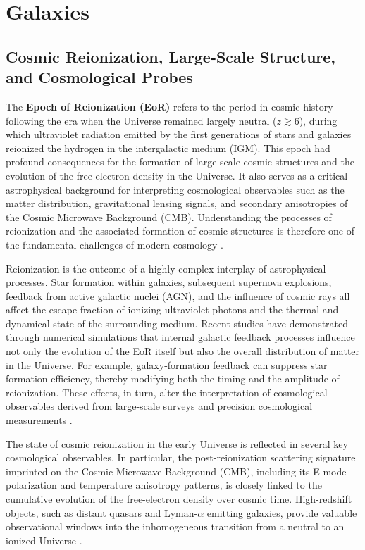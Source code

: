 \section{Galaxies}\label{galaxies}

\subsection{Cosmic Reionization, Large-Scale Structure, and Cosmological Probes}\label{cosmic-reionization-large-scale-structure-and-cosmological-probes}

The \textbf{Epoch of Reionization (EoR)} refers to the period in cosmic history following the era when the Universe remained largely neutral ($z\gtrsim6$), during which ultraviolet radiation emitted by the first generations of stars and galaxies reionized the hydrogen in the intergalactic medium (IGM). This epoch had profound consequences for the formation of large-scale cosmic structures and the evolution of the free-electron density in the Universe. It also serves as a critical astrophysical background for interpreting cosmological observables such as the matter distribution, gravitational lensing signals, and secondary anisotropies of the Cosmic Microwave Background (CMB). Understanding the processes of reionization and the associated formation of cosmic structures is therefore one of the fundamental challenges of modern cosmology \cite{ahn2019}.

Reionization is the outcome of a highly complex interplay of astrophysical processes. Star formation within galaxies, subsequent supernova explosions, feedback from active galactic nuclei (AGN), and the influence of cosmic rays all affect the escape fraction of ionizing ultraviolet photons and the thermal and dynamical state of the surrounding medium. Recent studies have demonstrated through numerical simulations that internal galactic feedback processes influence not only the evolution of the EoR itself but also the overall distribution of matter in the Universe. For example, galaxy-formation feedback can suppress star formation efficiency, thereby modifying both the timing and the amplitude of reionization. These effects, in turn, alter the interpretation of cosmological observables derived from large-scale surveys and precision cosmological measurements \cite{farcy2025}.

The state of cosmic reionization in the early Universe is reflected in several key cosmological observables. In particular, the post-reionization scattering signature imprinted on the Cosmic Microwave Background (CMB), including its E-mode polarization and temperature anisotropy patterns, is closely linked to the cumulative evolution of the free-electron density over cosmic time. High-redshift objects, such as distant quasars and Lyman-$\alpha$ emitting galaxies, provide valuable observational windows into the inhomogeneous transition from a neutral to an ionized Universe \cite{smith2022}.

